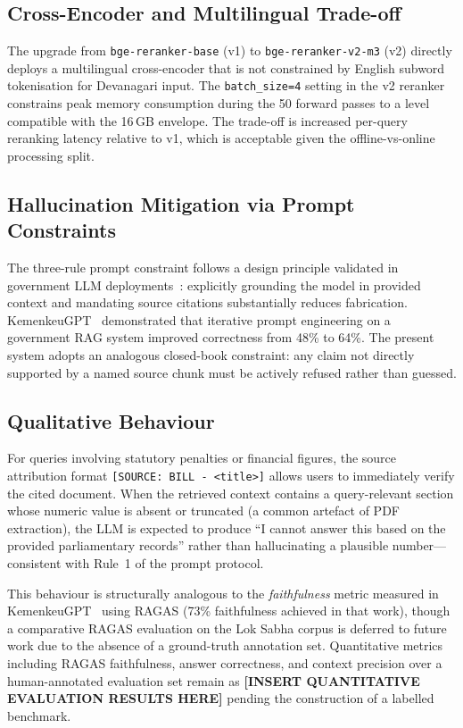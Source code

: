 \documentclass[conference]{IEEEtran}
\begin{document}
\subsection{Cross-Encoder and Multilingual Trade-off}

The upgrade from \texttt{bge-reranker-base} (v1) to
\texttt{bge-reranker-v2-m3} (v2) directly deploys
a multilingual cross-encoder that is not constrained by English subword
tokenisation for Devanagari input.
The \texttt{batch\_size=4} setting in the v2 reranker constrains peak
memory consumption during the 50 forward passes to a level compatible with
the 16\,GB envelope.
The trade-off is increased per-query reranking latency relative to v1,
which is acceptable given the offline-vs-online processing split.

\subsection{Hallucination Mitigation via Prompt Constraints}

The three-rule prompt constraint follows a design principle validated in
government LLM deployments~\cite{kemenkeu2024}: explicitly grounding the
model in provided context and mandating source citations substantially
reduces fabrication.
KemenkeuGPT~\cite{kemenkeu2024} demonstrated that iterative prompt engineering
on a government RAG system improved correctness from 48\% to 64\%.
The present system adopts an analogous closed-book constraint: any claim not
directly supported by a named source chunk must be actively refused rather
than guessed.

\subsection{Qualitative Behaviour}

For queries involving statutory penalties or financial figures, the source
attribution format \texttt{[SOURCE: BILL - <title>]} allows users to
immediately verify the cited document.
When the retrieved context contains a query-relevant section whose
numeric value is absent or truncated (a common artefact of PDF
extraction), the LLM is expected to produce ``I cannot answer this based on
the provided parliamentary records'' rather than hallucinating a plausible
number---consistent with Rule~1 of the prompt protocol.

This behaviour is structurally analogous to the \emph{faithfulness} metric
measured in KemenkeuGPT~\cite{kemenkeu2024} using RAGAS (73\% faithfulness
achieved in that work), though a comparative RAGAS evaluation on the Lok Sabha
corpus is deferred to future work due to the absence of a ground-truth
annotation set.
Quantitative metrics including RAGAS faithfulness, answer correctness,
and context precision over a human-annotated evaluation set remain as
\textbf{[INSERT QUANTITATIVE EVALUATION RESULTS HERE]} pending the construction
of a labelled benchmark.
\end{document}
